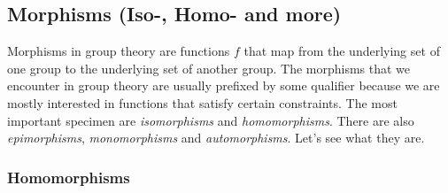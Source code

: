 





\subsection{Morphisms (Iso-, Homo- and more)}



Morphisms in group theory are functions $f$ that map from the underlying set of one group to the underlying set of another group. The morphisms that we encounter in group theory are usually prefixed by some qualifier because we are mostly interested in functions that satisfy certain constraints. The most important specimen are \emph{isomorphisms} and \emph{homomorphisms}. There are also \emph{epimorphisms}, \emph{monomorphisms} and \emph{automorphisms}. Let's see what they are.


\subsubsection{Homomorphisms}

